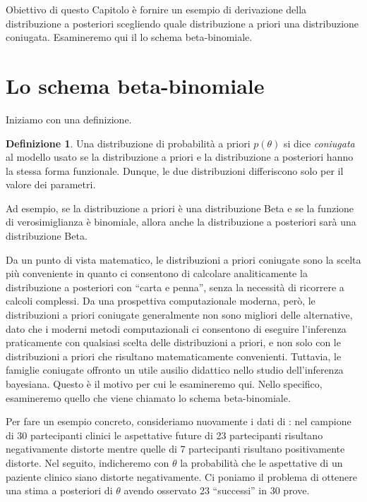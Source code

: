 \documentclass[
  11pt,
]{krantz}
\theoremstyle{definition}
\newtheorem{definition}{Definizione}[chapter]
\theoremstyle{definition}
\theoremstyle{definition}
\theoremstyle{definition}
\theoremstyle{remark}
\begin{document}
Obiettivo di questo Capitolo è fornire un esempio di derivazione della distribuzione a posteriori scegliendo quale distribuzione a priori una distribuzione coniugata. Esamineremo qui il lo schema beta-binomiale.

\hypertarget{chapter-distr-priori-coniugate}{%
\section{Lo schema beta-binomiale}\label{chapter-distr-priori-coniugate}}

Iniziamo con una definizione.

\begin{definition}
Una distribuzione di probabilità a priori \(p(\theta)\) si dice \emph{coniugata} al modello usato se la distribuzione a priori e la distribuzione a posteriori hanno la stessa forma funzionale. Dunque, le due distribuzioni differiscono solo per il valore dei parametri.
\end{definition}

Ad esempio, se la distribuzione a priori è una distribuzione Beta e se la funzione di verosimiglianza è binomiale, allora anche la distribuzione a posteriori sarà una distribuzione Beta.

Da un punto di vista matematico, le distribuzioni a priori coniugate sono la scelta più conveniente in quanto ci consentono di calcolare analiticamente la distribuzione a posteriori con ``carta e penna'', senza la necessità di ricorrere a calcoli complessi. Da una prospettiva computazionale moderna, però, le distribuzioni a priori coniugate generalmente non sono migliori delle alternative, dato che i moderni metodi computazionali ci consentono di eseguire l'inferenza praticamente con qualsiasi scelta delle distribuzioni a priori, e non solo con le distribuzioni a priori che risultano matematicamente convenienti. Tuttavia, le famiglie coniugate offronto un utile ausilio didattico nello studio dell'inferenza bayesiana. Questo è il motivo per cui le esamineremo qui. Nello specifico, esamineremo quello che viene chiamato lo schema beta-binomiale.

Per fare un esempio concreto, consideriamo nuovamente i dati di \citet{zetschefuture2019}: nel campione di 30 partecipanti clinici le aspettative future di 23 partecipanti risultano negativamente distorte mentre quelle di 7 partecipanti risultano positivamente distorte. Nel seguito, indicheremo con \(\theta\) la probabilità che le aspettative di un paziente clinico siano distorte negativamente. Ci poniamo il problema di ottenere una stima a posteriori di \(\theta\) avendo osservato 23 ``successi'' in 30 prove.
\end{document}
